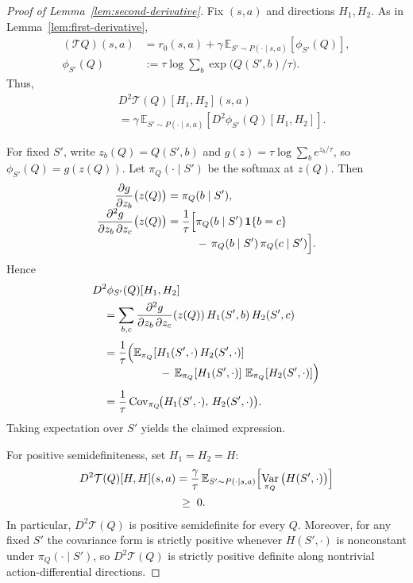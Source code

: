 \documentclass{article}
\DeclareMathOperator{\Var}{Var}
\newcommand{\Cov}{\mathrm{Cov}}
\theoremstyle{plain}
\theoremstyle{definition}
\theoremstyle{remark}
\newcommand{\E}{\mathbb{E}}
\begin{document}
\begin{proof}[Proof of Lemma~\ref{lem:second-derivative}]
Fix $(s,a)$ and directions $H_1,H_2$.  As in
Lemma~\ref{lem:first-derivative},
\begin{align*}
(\mathcal T Q)(s,a)
&=
r_0(s,a)
+
\gamma\,\E_{S'\sim P(\cdot\mid s,a)}
\!\left[\phi_{S'}(Q)\right],\\[0.25em]
\phi_{S'}(Q)
&:=
\tau\log\!\sum_{b}\exp\!\bigl(Q(S',b)/\tau\bigr).
\end{align*}
Thus,
\begin{align*}
&D^2\mathcal T(Q)[H_1,H_2](s,a)\\
\qquad &=
\gamma\,\E_{S'\sim P(\cdot\mid s,a)}
\!\left[
   D^2\phi_{S'}(Q)[H_1,H_2]
\right].
\end{align*}

For fixed $S'$, write $z_b(Q)=Q(S',b)$ and
$g(z)=\tau\log\sum_{b}e^{z_b/\tau}$, so $\phi_{S'}(Q)=g(z(Q))$.
Let $\pi_Q(\cdot\mid S')$ be the softmax at $z(Q)$.
Then
\begin{align*}
\frac{\partial g}{\partial z_b}\bigl(z(Q)\bigr)
&= \pi_Q(b\mid S'),
\\[-0.4em]
\frac{\partial^2 g}{\partial z_b\,\partial z_c}\bigl(z(Q)\bigr)
&=
\frac{1}{\tau}\Bigl[
   \pi_Q(b\mid S')\,\mathbf 1\{b=c\}
\\[-0.4em]
&\hphantom{=\frac{1}{\tau}\Bigl[}\;
   -\,\pi_Q(b\mid S')\,\pi_Q(c\mid S')
\Bigr].
\end{align*}
Hence
\begin{align*}
&  D^2\phi_{S'}(Q)[H_1,H_2]
\\
&\quad =
\sum_{b,c}
\frac{\partial^2 g}{\partial z_b\,\partial z_c}(z(Q))\,
H_1(S',b)\,H_2(S',c)
\\[0.25em]
&\quad =
\frac{1}{\tau}\Bigl(
   \E_{\pi_Q}\!\left[H_1(S',\cdot)\,H_2(S',\cdot)\right]
\\[-0.4em]
&\qquad\qquad\qquad
   -\,\E_{\pi_Q}\!\left[H_1(S',\cdot)\right]\,
      \E_{\pi_Q}\!\left[H_2(S',\cdot)\right]
\Bigr)
\\[0.25em]
&\quad =
\frac{1}{\tau}\,
\Cov_{\pi_Q}\!\bigl(
   H_1(S',\cdot),\,H_2(S',\cdot)
\bigr).
\end{align*}
Taking expectation over $S'$ yields the claimed expression.

\medskip

For positive semidefiniteness, set $H_1 = H_2 = H$:
\begin{align*}
D^2\mathcal T(Q)[H,H](s,a)
&=
\frac{\gamma}{\tau}\,
\E_{S' \sim P(\cdot\mid s,a)}
\Bigl[
   \Var_{\pi_Q}\big(H(S',\cdot)\big)
\Bigr]\\
&\;\ge\; 0.
\end{align*}
In particular, $D^2\mathcal T(Q)$ is positive semidefinite for every $Q$.
Moreover, for any fixed $S'$ the covariance form is strictly positive
whenever $H(S',\cdot)$ is nonconstant under $\pi_Q(\cdot\mid S')$,
so $D^2\mathcal T(Q)$ is strictly positive definite along
nontrivial action-differential directions.
\end{proof}
\end{document}
